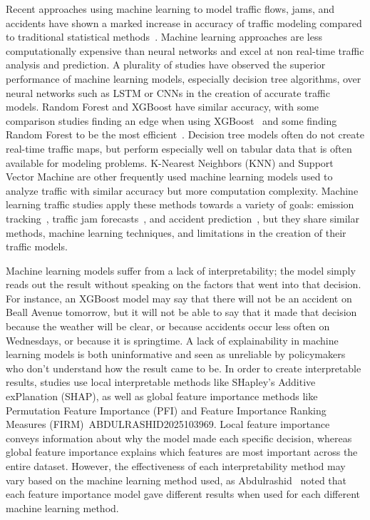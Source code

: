 \documentclass[12pt]{article}
\begin{document}
Recent approaches using machine learning to model
traffic flows, jams, and accidents have shown a marked increase in accuracy of traffic modeling compared to traditional statistical methods~\cite{app15073866}.
Machine learning approaches are less computationally expensive than neural networks and excel at non real-time traffic analysis and prediction.
A plurality of studies have observed the superior performance of machine learning models, especially decision tree algorithms, over neural 
networks such as LSTM or CNNs in the creation of accurate traffic models. Random Forest and XGBoost have similar accuracy,
with some comparison studies finding an edge when using XGBoost~\cite{Dorosan, ABDULRASHID2025103969} 
and some finding Random Forest to be the most efficient~\cite{HAMMOUMI2025813, 11253819}. 
Decision tree models often do not create real-time traffic maps, but perform especially well on tabular data that is often available for modeling problems. 
K-Nearest Neighbors (KNN) and Support Vector Machine are other frequently used machine learning models used to analyze traffic with similar accuracy but more computation complexity.
Machine learning traffic studies apply these methods towards a variety of goals: emission tracking~\cite{Champahom}, 
traffic jam forecasts~\cite{HAMMOUMI2025813}, and accident prediction~\cite{AHMED2023100814}, but
they share similar methods, machine learning techniques, and limitations in the creation of their traffic models. 


Machine learning models suffer from a lack of interpretability; the model simply reads out the result without speaking on the
factors that went into that decision. For instance, an XGBoost model may say that there will not be an accident on Beall Avenue tomorrow,
but it will not be able to say that it made that decision because the weather will be clear, or because accidents occur less often
on Wednesdays, or because it is springtime. A lack of explainability in machine learning models is both uninformative and 
seen as unreliable by policymakers who don't understand how the result came to be. 
In order to create interpretable results, studies use local interpretable methods like
SHapley's Additive exPlanation (SHAP), as well as global feature importance methods like Permutation Feature Importance (PFI)
and Feature Importance Ranking Measures (FIRM)~{ABDULRASHID2025103969}. Local feature importance conveys information about why the model made each specific
decision, whereas global feature importance explains which features are most important across the entire dataset. 
However, the effectiveness of each interpretability method may vary based on the machine learning method used, as Abdulrashid~\cite{ABDULRASHID2025103969}
noted that each feature importance model gave different results when used for each different machine learning method.
\end{document}
